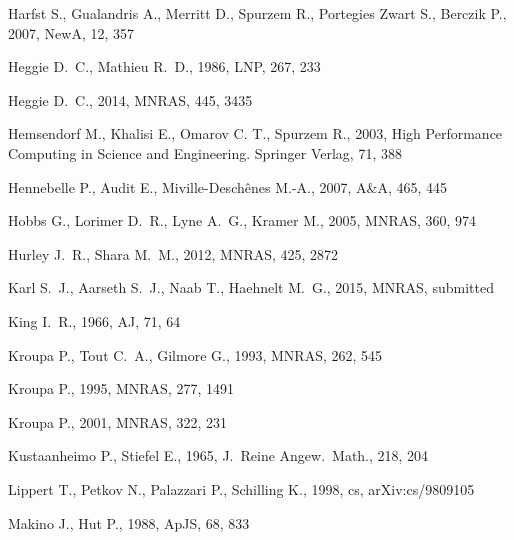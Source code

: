 \documentclass[usenatbib,aas_macros]{mn2e}
\begin{document}
\begin{thebibliography}{999}
Harfst S., Gualandris A., Merritt D., Spurzem R., Portegies Zwart S., 
Berczik P., 2007, NewA, 12, 357 

 Heggie D.~C., Mathieu R.~D., 1986, LNP, 267, 233 

 Heggie 
D.~C., 2014, MNRAS, 445, 3435 

 Hemsendorf M.,
Khalisi E., Omarov C. T., Spurzem R., 2003, High Performance Computing in Science and Engineering. Springer Verlag, 71, 388

 Hennebelle P., Audit E., Miville-Desch{\^e}nes M.-A., 2007, A\&A, 465, 445 

Hobbs G., Lorimer D.~R., Lyne A.~G., Kramer M., 2005, MNRAS, 360, 974 

 Hurley J.~R., Shara M.~M., 2012, MNRAS, 425, 2872 

Karl S.~J., Aarseth S.~J., Naab T., Haehnelt M.~G., 2015, MNRAS, submitted

 King 
I.~R., 1966, AJ, 71, 64 

 Kroupa P., Tout C.~A., Gilmore G., 1993, MNRAS, 262, 545 

 Kroupa 
P., 1995, MNRAS, 277, 1491 

 Kroupa 
P., 2001, MNRAS, 322, 231 

Kustaanheimo P., Stiefel E., 1965, J.~Reine Angew.~Math., 218, 204

 Lippert T., Petkov N., Palazzari P., 
Schilling K., 1998, cs, arXiv:cs/9809105 

 Makino J., Hut P., 1988, ApJS, 68, 833 


\end{thebibliography}
\end{document}
